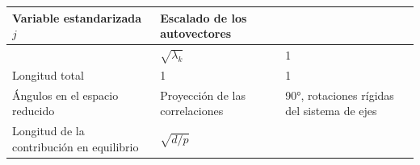 \documentclass[]{book}
\theoremstyle{definition}
\theoremstyle{definition}
\theoremstyle{definition}
\theoremstyle{remark}
\begin{document}
\begin{longtable}[]{@{}lll@{}}
\toprule
\begin{minipage}[b]{0.22\columnwidth}\raggedright
Variable estandarizada \(j\)\strut
\end{minipage} & \begin{minipage}[b]{0.38\columnwidth}\raggedright
Escalado de los autovectores\strut
\end{minipage} & \begin{minipage}[b]{0.31\columnwidth}\raggedright
\strut
\end{minipage}\tabularnewline
\midrule
\endhead
\begin{minipage}[t]{0.22\columnwidth}\raggedright
\strut
\end{minipage} & \begin{minipage}[t]{0.38\columnwidth}\raggedright
\(\sqrt{\lambda_{k}}\)\strut
\end{minipage} & \begin{minipage}[t]{0.31\columnwidth}\raggedright
1\strut
\end{minipage}\tabularnewline
\begin{minipage}[t]{0.22\columnwidth}\raggedright
Longitud total\strut
\end{minipage} & \begin{minipage}[t]{0.38\columnwidth}\raggedright
1\strut
\end{minipage} & \begin{minipage}[t]{0.31\columnwidth}\raggedright
1\strut
\end{minipage}\tabularnewline
\begin{minipage}[t]{0.22\columnwidth}\raggedright
Ángulos en el espacio reducido\strut
\end{minipage} & \begin{minipage}[t]{0.38\columnwidth}\raggedright
Proyección de las correlaciones\strut
\end{minipage} & \begin{minipage}[t]{0.31\columnwidth}\raggedright
90°, rotaciones rígidas del sistema de ejes\strut
\end{minipage}\tabularnewline
\begin{minipage}[t]{0.22\columnwidth}\raggedright
Longitud de la contribución en equilibrio\strut
\end{minipage} & \begin{minipage}[t]{0.38\columnwidth}\raggedright
\(\sqrt{d/p}\)\strut
\end{minipage} & \begin{minipage}[t]{0.31\columnwidth}\raggedright

\end{minipage}
\end{longtable}
\end{document}
